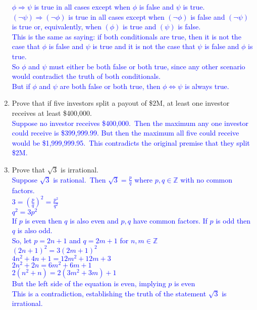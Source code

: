 \documentclass[13.5pt]{article}
\begin{document}
\begin{enumerate}
\textcolor{blue} {\( \phi \Rightarrow \psi \) is true in all cases except when \(\phi\) is false and \(\psi \) is true. }\\
\textcolor{blue} {\( (\neg \psi) \Rightarrow (\neg \phi) \) is true in all cases except when \( (\neg \phi)\) is false and \((\neg \psi) \) is true or, equivalently, when \((\phi)\) is true and \((\psi) \) is false.}\\
\textcolor{blue} {This is the same as saying: if both conditionals are true, then it is not the case that \(\phi\) is false and \(\psi \) is true and it is not the case that \(\psi\) is false and \(\phi \) is true. }\\
\textcolor{blue} {So \(\phi\) and \(\psi \) must either be both false or both true, since any other scenario would contradict the truth of both conditionals. }\\
\textcolor{blue} {But if \(\phi\) and \(\psi \) are both false or both true, then \(\phi \Leftrightarrow \psi \) is always true. }

\item{Prove that if five investors split a payout of \$\(2\)M, at least one investor receives at least \$400,000. }\\
\textcolor{blue} {Suppose no investor receives \$400,000.}\ 
\textcolor{blue} {Then the maximum any one investor could receive is \$399,999.99. But then the maximum all five could receive would be \$1,999,999.95.}\
\textcolor{blue} {This contradicts the original premise that they split \$2M.} 

\item{Prove that \(\sqrt{3} \) is irrational. }\\
\textcolor{blue} {Suppose \(\sqrt{3} \) is rational.}\
\textcolor{blue} {Then \(\sqrt{3}=\frac{p}{q}\) where \(p,q \in\mathbb{Z}\) with no common factors.}\\
\textcolor{blue} {\( 3=(\frac{p}{q})^2 = \frac{p^2}{q^2} \) }\\
\textcolor{blue} {\( q^2 = 3p^2 \) }\\
\textcolor{blue} {If \(p\) is even then \(q\) is also even and \(p, q\) have common factors. If \(p\) is odd then \(q\) is also odd.}\\
\textcolor{blue} {So, let \(p=2n+1\) and \(q=2m+1\) for \(n,m \in\mathbb{Z}\)}\\
\textcolor{blue} {\( (2n+1)^2 = 3(2m+1)^2 \) }\\
\textcolor{blue} {\( 4n^2+4n+1 = 12m^2+12m+3 \) }\\
\textcolor{blue} {\( 2n^2+2n=6m^2+6m+1\) }\\
\textcolor{blue} {\( 2(n^2+n)=2(3m^2+3m)+1\) }\\
\textcolor{blue} {But the left side of the equation is even, implying \(p\) is even}\\
\textcolor{blue} {This is a contradiction, establishing the truth of the statement \(\sqrt{3} \) is irrational.}


\end{enumerate}
\end{document}
